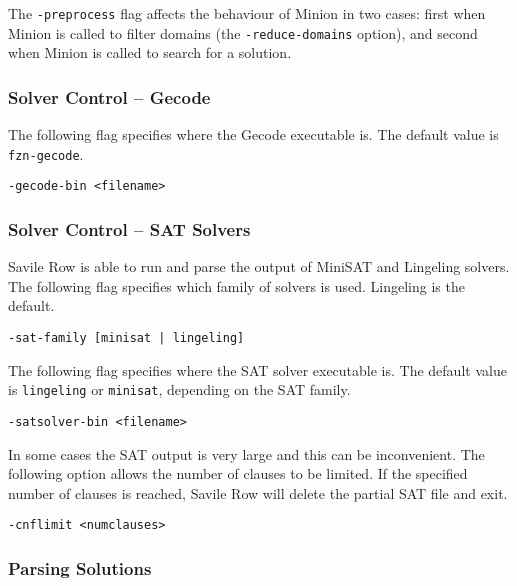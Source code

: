 \documentclass[a4paper]{article}
\newcommand{\savilerow}{{\sc Savile Row}\xspace}
\begin{document}
The \texttt{-preprocess} flag affects the behaviour of Minion in two cases: first 
when Minion is called to filter domains (the \texttt{-reduce-domains} option), and 
second when Minion is called to search for a solution. 

\subsubsection{Solver Control -- Gecode}

The following flag specifies where the Gecode executable is. The default value
is \texttt{fzn-gecode}. 

\begin{verbatim}
-gecode-bin <filename>
\end{verbatim}

\subsubsection{Solver Control -- SAT Solvers}

\savilerow is able to run and parse the output of MiniSAT and Lingeling solvers. The 
following flag specifies which family of solvers is used. Lingeling is the default. 

\begin{verbatim}
-sat-family [minisat | lingeling]
\end{verbatim}

The following flag specifies where the SAT solver executable is. The default value
is \texttt{lingeling} or \texttt{minisat}, depending on the SAT family. 

\begin{verbatim}
-satsolver-bin <filename>
\end{verbatim}

In some cases the SAT output is very large and this can be inconvenient. The following
option allows the number of clauses to be limited. If the specified number of 
clauses is reached, \savilerow will delete the partial SAT file and exit. 

\begin{verbatim}
-cnflimit <numclauses>
\end{verbatim}


\subsubsection{Parsing Solutions}
\end{document}
